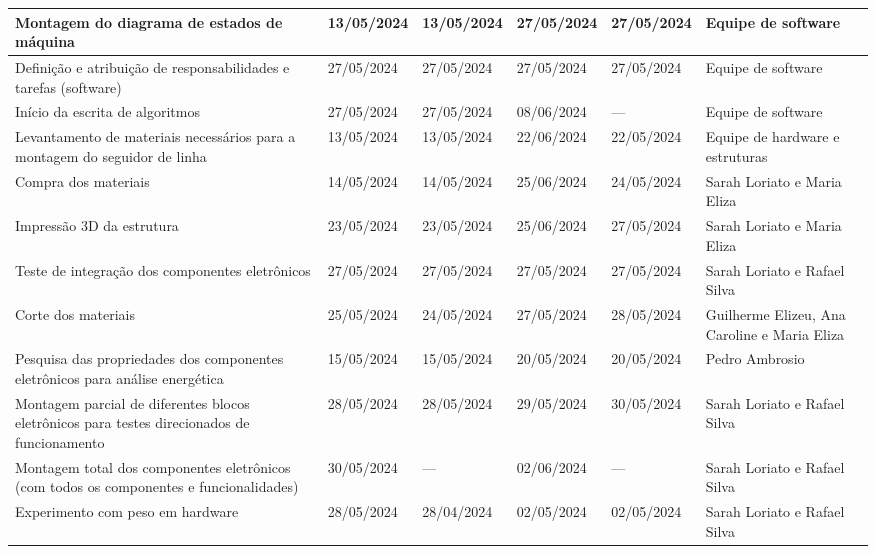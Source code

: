 \begin{xltabular}{\columnwidth}{X|X|X|X|X|X}
  Montagem do diagrama de estados de máquina & 13/05/2024 & 13/05/2024 & 27/05/2024 & 27/05/2024 & Equipe de software \\
  \hline

  Definição e atribuição de responsabilidades e tarefas (software) & 27/05/2024 & 27/05/2024 & 27/05/2024 & 27/05/2024 & Equipe de software \\
  \hline

  Início da escrita de algoritmos & 27/05/2024 & 27/05/2024 & 08/06/2024 & --- & Equipe de software \\
  \hline

  Levantamento de materiais necessários para a montagem do seguidor de linha & 13/05/2024 & 13/05/2024 & 22/06/2024 & 22/05/2024 & Equipe de hardware e estruturas \\
  \hline

  Compra dos materiais & 14/05/2024 & 14/05/2024 & 25/06/2024 & 24/05/2024 & Sarah Loriato e Maria Eliza \\
  \hline

  Impressão 3D da estrutura & 23/05/2024 & 23/05/2024 & 25/06/2024 & 27/05/2024 & Sarah Loriato e Maria Eliza \\
  \hline

  Teste de integração dos componentes eletrônicos & 27/05/2024 & 27/05/2024 & 27/05/2024 & 27/05/2024 & Sarah Loriato e Rafael Silva \\
  \hline

  Corte dos materiais & 25/05/2024 & 24/05/2024 & 27/05/2024 & 28/05/2024 & Guilherme Elizeu, Ana Caroline e Maria Eliza \\
  \hline

  Pesquisa das propriedades dos componentes eletrônicos para análise energética & 15/05/2024 & 15/05/2024 & 20/05/2024 & 20/05/2024 & Pedro Ambrosio \\
  \hline

  Montagem parcial de diferentes blocos eletrônicos para testes direcionados de funcionamento & 28/05/2024 & 28/05/2024 & 29/05/2024 & 30/05/2024 & Sarah Loriato e Rafael Silva \\
  \hline

  Montagem total dos componentes eletrônicos (com todos os componentes e funcionalidades) & 30/05/2024 & --- & 02/06/2024 & --- & Sarah Loriato e Rafael Silva \\
  \hline

  Experimento com peso em hardware & 28/05/2024 & 28/04/2024 & 02/05/2024 & 02/05/2024 & Sarah Loriato e Rafael Silva \\
  \hline


\end{xltabular}
